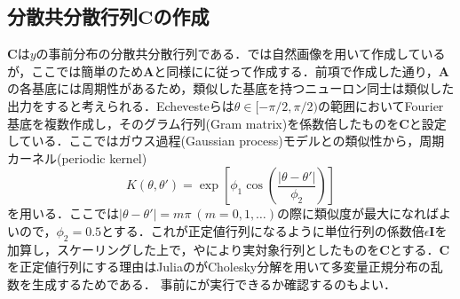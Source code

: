 \subsection{分散共分散行列$\mathbf{C}$の作成}
$\mathbf{C}$は$y$の事前分布の分散共分散行列である．\citep{Orban2016-tm}では自然画像を用いて作成しているが，ここでは簡単のため$\mathbf{A}$と同様に\citep{Echeveste2020-sh}に従って作成する．前項で作成した通り，$\mathbf{A}$の各基底には周期性があるため，類似した基底を持つニューロン同士は類似した出力をすると考えられる．Echevesteらは$\theta\in[-\pi/2, \pi/2)$の範囲においてFourier基底を複数作成し，そのグラム行列(Gram matrix)を係数倍したものを$\mathbf{C}$と設定している．ここではガウス過程(Gaussian process)モデルとの類似性から，周期カーネル(periodic kernel) 
\begin{equation}
K(\theta, \theta')=\exp\left[\phi_1 \cos \left(\dfrac{|\theta-\theta'|}{\phi_2}\right)\right]
\end{equation}
を用いる．ここでは$|\theta-\theta'|=m\pi\ (m=0,1,\ldots)$の際に類似度が最大になればよいので，$\phi_2=0.5$とする．これが正定値行列になるように単位行列の係数倍$\epsilon\mathbf{I}$を加算し，スケーリングした上で，やにより実対象行列としたものを$\mathbf{C}$とする．$\mathbf{C}$を正定値行列にする理由はJuliaのがCholesky分解を用いて多変量正規分布の乱数を生成するためである． 事前にが実行できるか確認するのもよい．

